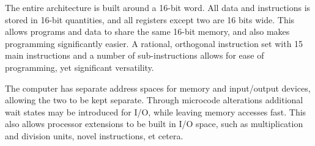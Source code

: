 \documentclass[11pt,a4paper,twocolumns]{article}
\begin{document}
The entire architecture is built around a 16-bit word. All data and
instructions is stored in 16-bit quantities, and all registers except
two are 16 bits wide. This allows programs and data to share the same
16-bit memory, and also makes programming significantly easier. A
rational, orthogonal instruction set with 15 main instructions and a
number of sub-instructions allows for ease of programming, yet
significant versatility.

The computer has separate address spaces for memory and input/output
devices, allowing the two to be kept separate. Through microcode
alterations additional wait states may be introduced for I/O, while
leaving memory accesses fast. This also allows processor extensions to
be built in I/O space, such as multiplication and division units,
novel instructions, et cetera.
\end{document}

